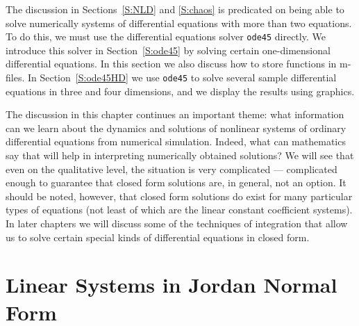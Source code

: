 \documentclass{ximera}
\begin{document}
The discussion in Sections~\ref{S:NLD} and \ref{S:chaos} is predicated on 
being able to solve numerically systems of differential equations with more 
than two equations.  To do this, we must use the \Matlab differential 
equations solver {\tt ode45} directly.  We introduce this solver in 
Section~\ref{S:ode45} by solving certain one-dimensional differential 
equations.  In this section we also discuss how to store functions in \Matlab 
m-files.  In Section~\ref{S:ode45HD} we use {\tt ode45} to solve several 
sample differential equations in three and four dimensions, and we display 
the results using \Matlab graphics. 

The discussion in this chapter continues an important theme: what 
information can we learn about the dynamics and solutions of nonlinear 
systems of ordinary differential equations from numerical simulation.  
Indeed, what can mathematics say that will help in interpreting numerically 
obtained solutions?  We will see that even on the qualitative level, the 
situation is very complicated --- complicated enough to guarantee that closed 
form solutions are, in general, not an option.  It should be noted, however,
that closed form solutions do exist for many particular types of equations 
(not least of which are the linear constant coefficient systems).  In later
chapters we will discuss some of the techniques of integration that allow us
to solve certain special kinds of differential equations in closed form.


\section{Linear Systems in Jordan Normal Form}
\label{sec:LinHomSys}
\end{document}
